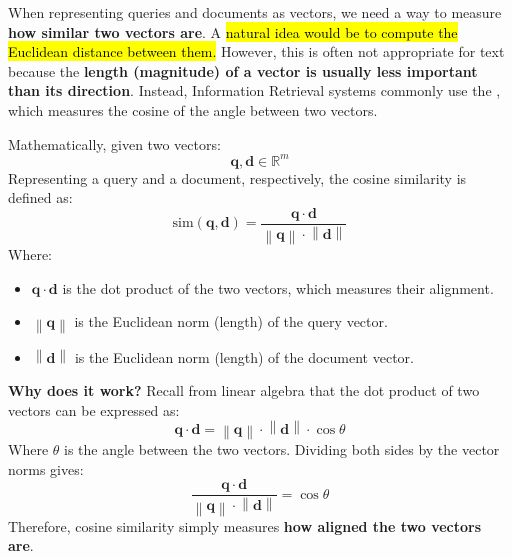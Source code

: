 \begin{definitionbox}
    When representing queries and documents as vectors, we need a way to measure \textbf{how similar two vectors are}. A \hl{natural idea would be to compute the Euclidean distance between them.} However, this is often not appropriate for text because the \textbf{length (magnitude) of a vector is usually less important than its direction}. Instead, Information Retrieval systems commonly use the , which measures the cosine of the angle between two vectors.

    \highspace
    Mathematically, given two vectors:
    \begin{equation*}
        \mathbf{q}, \mathbf{d} \in \mathbb{R}^m
    \end{equation*}
    Representing a query and a document, respectively, the cosine similarity is defined as:
    \begin{equation}\label{eq:cosine-similarity}
        \mathrm{sim}\left(\mathbf{q}, \mathbf{d}\right) = \frac{\mathbf{q} \cdot \mathbf{d}}{\left\|\mathbf{q}\right\| \cdot \left\|\mathbf{d}\right\|}
    \end{equation}
    Where:
    \begin{itemize}
        \item $\mathbf{q} \cdot \mathbf{d}$ is the dot product of the two vectors, which measures their alignment.
        \item $\left\|\mathbf{q}\right\|$ is the Euclidean norm (length) of the query vector.
        \item $\left\|\mathbf{d}\right\|$ is the Euclidean norm (length) of the document vector.
    \end{itemize}

    \highspace
    \textcolor{Green3}{ \textbf{Why does it work?}} Recall from linear algebra that the dot product of two vectors can be expressed as:
    \begin{equation*}
        \mathbf{q} \cdot \mathbf{d} = \left\|\mathbf{q}\right\| \cdot \left\|\mathbf{d}\right\| \cdot \cos\theta
    \end{equation*}
    Where $\theta$ is the angle between the two vectors. Dividing both sides by the vector norms gives:
    \begin{equation*}
        \frac{\mathbf{q} \cdot \mathbf{d}}{\left\|\mathbf{q}\right\| \cdot \left\|\mathbf{d}\right\|} = \cos\theta
    \end{equation*}
    Therefore, cosine similarity simply measures \textbf{how aligned the two vectors are}.


\end{definitionbox}
